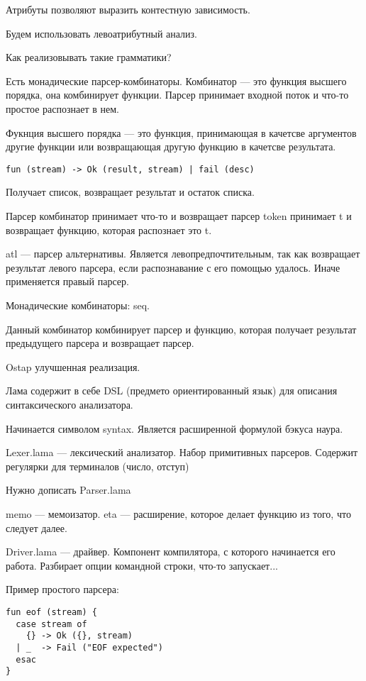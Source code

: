 Атрибуты позволяют выразить контестную зависимость.

Будем использовать левоатрибутный анализ.

Как реализовывать такие грамматики?

Есть монадические парсер-комбинаторы. Комбинатор --- это функция высшего
порядка, она комбинирует функции. Парсер принимает входной поток и что-то
простое распознает в нем.

Фукнция высшего порядка --- это функция, принимающая в качетсве аргументов
другие функции или возвращающая другую функцию в качетсве результата.

\begin{verbatim}
fun (stream) -> Ok (result, stream) | fail (desc)
\end{verbatim}

Получает список, возвращает результат и остаток списка.

Парсер комбинатор принимает что-то и возвращает парсер
token принимает t и возвращает функцию, которая распознает это t.

atl --- парсер альтернативы. Является левопредпочтительным, так как возвращает
результат левого парсера, если распознавание с его помощью удалось. Иначе
применяется правый парсер.

Монадические комбинаторы: seq.

Данный комбинатор комбинирует парсер и функцию, которая получает результат
предыдущего парсера и возвращает парсер.

Ostap улучшенная реализация.

Лама содержит в себе DSL (предмето ориентированный язык) для описания
синтаксического анализатора.

Начинается символом syntax. Является расширенной формулой бэкуса наура.

Lexer.lama --- лексический анализатор. Набор примитивных парсеров. Содержит
регулярки для терминалов (число, отступ)

Нужно дописать Parser.lama

memo --- мемоизатор. eta --- расширение, которое делает функцию из того, что
следует далее.

Driver.lama --- драйвер. Компонент компилятора, с которого начинается его
работа. Разбирает опции командной строки, что-то запускает...



Пример простого парсера:
\begin{verbatim}
fun eof (stream) {
  case stream of
    {} -> Ok ({}, stream)
  | _  -> Fail ("EOF expected")
  esac
}
\end{verbatim}

